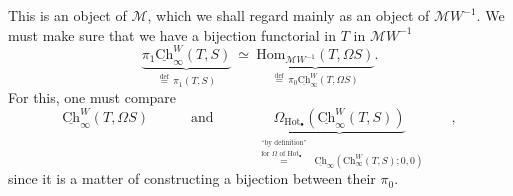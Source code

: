 \documentclass[11pt]{article}
\newcommand{\printedpage}[1]{\marginpar{\footnotesize p.~#1}}
\newcommand{\Chu}{\underline{\mathrm{Ch}}}
\newcommand{\Hot}{\mathrm{Hot}}
\begin{document}
\newpage

\printedpage{16}

This is an object of $\mathcal{M}$, which we shall regard mainly as an object of $\mathcal{M}W^{-1}$. We must make sure that we have a bijection functorial in $T$ in $\mathcal{M}W^{-1}$
\[
\underbrace{\pi_1\Chu^W_\infty(T, S)}_{\overset{\text{def}}{=}\,\pi_1(T,S)} \ \simeq\ \underbrace{\mathrm{Hom}_{\mathcal{M}W^{-1}}(T, \Omega S)}_{\overset{\text{def}}{=}\,\pi_0\Chu^W_\infty(T,\Omega S)}.
\]
For this, one must compare
\[
\Chu^W_\infty(T, \Omega S) \qquad\quad \text{and} \qquad\quad \underbrace{\Omega_{\Hot_\bullet}(\Chu^W_\infty(T, S))}_{\overset{\substack{\text{``by definition''}\\ \text{for $\Omega$ of $\mathrm{Hot}_\bullet$}}}{=}\ \Chu_\infty(\mathrm{Ch}^W_\infty(T,S);0,0)} \qquad ,
\]
since it is a matter of constructing a bijection between their $\pi_0$.
\end{document}
